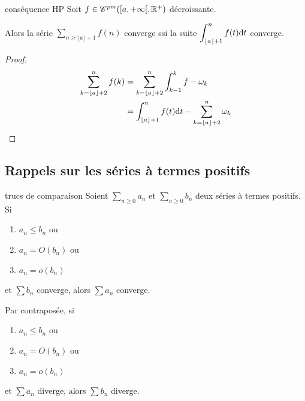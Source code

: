 \begin{proposition}{conséquence HP }{}
    Soit $f \in \mathscr C^{pm}([a, + \infty[, \mathbb{R}^+)$ décroissante. 

    Alors la série $\displaystyle \sum_{n \geqslant \lfloor a \rfloor + 1} f(n)$ converge ssi la suite 
    $\displaystyle \int_{\lfloor a \rfloor + 1 }^{n } f(t) \text d t$ converge.
\end{proposition}

\begin{proof}
    \begin{align*}
        \sum_{k = \lfloor a \rfloor + 2}^{n} f(k) & = \sum_{k = \lfloor a \rfloor + 2}^{n} \int_{k - 1 }^{k} f- \omega_k \\
                                                    & = \int_{\lfloor a \rfloor + 1}^{n} f(t) \text d t - \sum_{k = \lfloor a \rfloor + 2}^{n} \omega_k                                 
    \end{align*}

\end{proof}

\subsection{Rappels sur les séries à termes positifs }

\begin{theoreme}{trucs de comparaison }{}
    Soient $\sum_{n \geqslant 0 } a_n$ et $\sum_{n \geqslant 0} b_n$ deux séries à termes positifs. Si 
    
    \begin{enumerate}
        \item $a_n \leqslant b_n$ ou
        \item $a_n = O(b_n)$ ou
        \item $a_n = o(b_n)$ 
    \end{enumerate}

    et $\sum b_n$ converge, alors $\sum a_n$ converge.

    Par contraposée, si 
    \begin{enumerate}
        \item $a_n \leqslant b_n$ ou
        \item $a_n = O(b_n)$ ou
        \item $a_n = o(b_n)$ 
    \end{enumerate}
    et $\sum a_n$ diverge, alors $\sum b_n$ diverge. 
\end{theoreme}

